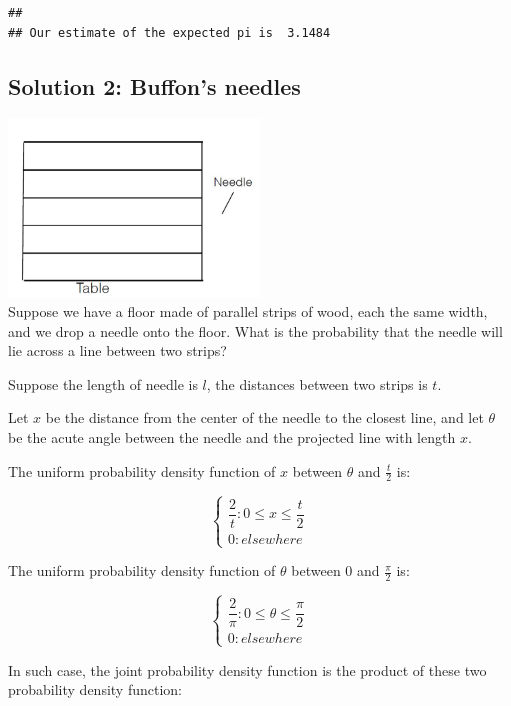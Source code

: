 \documentclass[]{article}
\begin{document}
\begin{verbatim}
## 
## Our estimate of the expected pi is  3.1484
\end{verbatim}

\subsection{Solution 2: Buffon's
needles}\label{solution-2-buffons-needles}

\includegraphics[width=0.50000\textwidth]{solution 2.jpg}\\
Suppose we have a floor made of parallel strips of wood, each the same
width, and we drop a needle onto the floor. What is the probability that
the needle will lie across a line between two strips?

Suppose the length of needle is \(l\), the distances between two strips
is \(t\).

Let \(x\) be the distance from the center of the needle to the closest
line, and let \(\theta\) be the acute angle between the needle and the
projected line with length \(x\).

The uniform probability density function of \(x\) between \(\theta\) and
\(\frac{t}{2}\) is:

\[\left\{  
             \begin{array}{ll}  
             \dfrac{2}{t} : 0 \le x \le \dfrac{t}{2}\\  
             0: elsewhere
             \end{array}  
\right. \]

The uniform probability density function of \(\theta\) between 0 and
\(\frac{\pi}{2}\) is:

\[\left\{
            \begin{array}{ll}
            \dfrac{2}{\pi}: 0 \le \theta \le \dfrac{\pi}{2}\\
            0:elsewhere
            \end{array}
\right.\]

In such case, the joint probability density function is the product of
these two probability density function:
\end{document}
